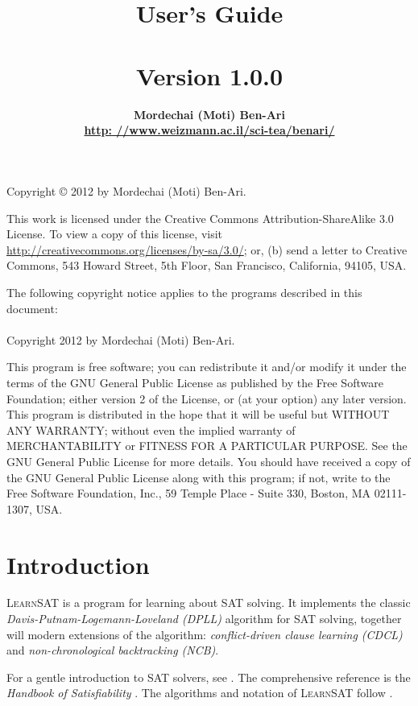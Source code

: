 \documentclass[11pt]{article}
\author{\bfseries Mordechai (Moti) Ben-Ari\\\url{http: //www.weizmann.ac.il/sci-tea/benari/}}
\title{\bfseries \ls\\\mbox{}\\
\bfseries\large User's Guide\\\mbox{}\\
\bfseries\normalsize Version 1.0.0}
\newcommand*{\ls}{\textsc{LearnSAT}}
\begin{document}
\maketitle
\thispagestyle{empty}

\vfill

\begin{center}
Copyright \copyright{} 2012 by Mordechai (Moti) Ben-Ari.
\end{center}
This work is licensed under the Creative Commons Attribution-ShareAlike 3.0
License. To view a copy of this license, visit
\url{http://creativecommons.org/licenses/by-sa/3.0/}; or, (b) send a letter
to Creative Commons, 543 Howard Street, 5th Floor, San Francisco,
California, 94105, USA.

\bigskip

 
\begin{center}
The following copyright notice applies to the programs described in this
document:\mbox{}\\\mbox{}\\
Copyright 2012 by Mordechai (Moti) Ben-Ari.
\end{center}

This program is free software; you can redistribute it and/or
modify it under the terms of the GNU General Public License
as published by the Free Software Foundation; either version 2
of the License, or (at your option) any later version.
This program is distributed in the hope that it will be useful
but WITHOUT ANY WARRANTY; without even the implied warranty of
MERCHANTABILITY or FITNESS FOR A PARTICULAR PURPOSE.
See the GNU General Public License for more details.
You should have received a copy of the GNU General Public License
along with this program; if not, write to the Free Software
Foundation, Inc., 59 Temple Place - Suite 330, Boston, MA
02111-1307, USA.

\newpage

\section{Introduction}

\ls{} is a program for learning about SAT solving. It implements the
classic \emph{Davis-Putnam-Logemann-Loveland (DPLL)} algorithm for SAT
solving, together will modern extensions of the algorithm:
\emph{conflict-driven clause learning (CDCL)} and
\emph{non-chronological backtracking (NCB)}.

For a gentle introduction to SAT solvers, see \cite[Chapter~6]{mlcs}.
The comprehensive reference is the \emph{Handbook of Satisfiability}
\cite{SAT}. The algorithms and notation of \ls{} follow \cite{mlm}.
\end{document}
